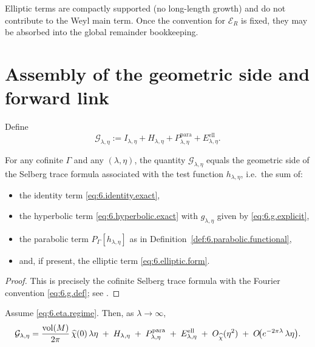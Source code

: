 \begin{remark}\label{rem:6.elliptic.lower.order}
Elliptic terms are compactly supported (no long-length growth) and do not contribute to the Weyl main term.
Once the convention for $\mathcal E_R$ is fixed, they may be absorbed into the global remainder bookkeeping.
\end{remark}

\section{Assembly of the geometric side and forward link}
\label{sec:ch6-assembly}

\begin{definition}\label{def:6.G.full}
Define
\begin{equation}\label{eq:6.G.full}
\mathcal G_{\lambda,\eta}
:=I_{\lambda,\eta}+H_{\lambda,\eta}+P_{\lambda,\eta}^{\mathrm{para}}+E_{\lambda,\eta}^{\mathrm{ell}}.
\end{equation}
\end{definition}

\begin{theorem}\label{thm:6.selberg.geometric}
For any cofinite $\Gamma$ and any $(\lambda,\eta)$, the quantity $\mathcal G_{\lambda,\eta}$ equals the geometric side
of the Selberg trace formula associated with the test function $h_{\lambda,\eta}$, i.e.\ the sum of:
\begin{itemize}
\item the identity term \eqref{eq:6.identity.exact},
\item the hyperbolic term \eqref{eq:6.hyperbolic.exact} with $g_{\lambda,\eta}$ given by \eqref{eq:6.g.explicit},
\item the parabolic term $P_\Gamma[h_{\lambda,\eta}]$ as in Definition~\ref{def:6.parabolic.functional},
\item and, if present, the elliptic term \eqref{eq:6.elliptic.form}.
\end{itemize}
\end{theorem}

\begin{proof}
This is precisely the cofinite Selberg trace formula with the Fourier convention \eqref{eq:6.g.def}; see
\cite{Selberg1956,Hejhal1983,Iwaniec2002}.
\end{proof}

\begin{proposition}\label{prop:6.main.term}
Assume \eqref{eq:6.eta.regime}. Then, as $\lambda\to\infty$,
\begin{equation}\label{eq:6.main.term}
\mathcal G_{\lambda,\eta}
=\frac{\mathop{\mathrm{vol}}\nolimits(M)}{2\pi}\,\widehat\chi(0)\,\lambda\eta
\;+\;H_{\lambda,\eta}
\;+\;P_{\lambda,\eta}^{\mathrm{para}}
\;+\;E_{\lambda,\eta}^{\mathrm{ell}}
\;+\;O_{\widehat\chi}(\eta^2)
\;+\;O\!\big(e^{-2\pi\lambda}\,\lambda\eta\big).
\end{equation}
\end{proposition}

